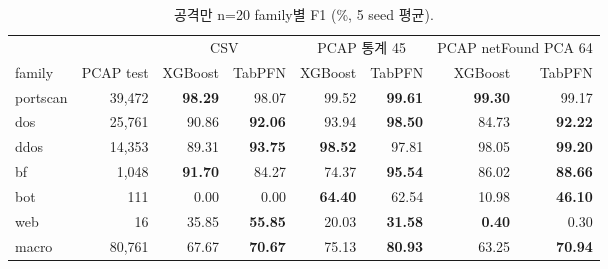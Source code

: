\begin{table}[H]
\centering\small
\caption{공격만 n=20 family별 F1 (\%, 5 seed 평균).}
\begin{tabular}{lr|rr|rr|rr}
\toprule & & \multicolumn{2}{c|}{CSV} & \multicolumn{2}{c|}{PCAP 통계 45} & \multicolumn{2}{c}{PCAP netFound PCA 64}\\
family & PCAP test & XGBoost & TabPFN & XGBoost & TabPFN & XGBoost & TabPFN\\\midrule
portscan & 39,472 & \textbf{98.29} & 98.07 & 99.52 & \textbf{99.61} & \textbf{99.30} & 99.17\\
dos & 25,761 & 90.86 & \textbf{92.06} & 93.94 & \textbf{98.50} & 84.73 & \textbf{92.22}\\
ddos & 14,353 & 89.31 & \textbf{93.75} & \textbf{98.52} & 97.81 & 98.05 & \textbf{99.20}\\
bf & 1,048 & \textbf{91.70} & 84.27 & 74.37 & \textbf{95.54} & 86.02 & \textbf{88.66}\\
bot & 111 & 0.00 & 0.00 & \textbf{64.40} & 62.54 & 10.98 & \textbf{46.10}\\
web & 16 & 35.85 & \textbf{55.85} & 20.03 & \textbf{31.58} & \textbf{0.40} & 0.30\\\midrule
macro & 80,761 & 67.67 & \textbf{70.67} & 75.13 & \textbf{80.93} & 63.25 & \textbf{70.94}\\
\bottomrule
\end{tabular}
\end{table}


